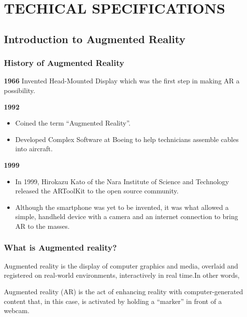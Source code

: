 \documentclass{article}
\begin{document}

\newpage
\section{TECHICAL SPECIFICATIONS}

\subsection{Introduction to Augmented Reality }

\subsubsection{History of Augmented Reality}
\par \textbf{1966} Invented Head-Mounted Display which was the first step in making AR a possibility.
\par \textbf{1992}
\begin{itemize}
\item Coined the term “Augmented Reality”.
\item Developed Complex Software at Boeing  to help technicians assemble cables into aircraft.
\end{itemize}

\par \textbf{1999}
\begin{itemize}
\item In 1999, Hirokazu Kato of the Nara Institute of Science and Technology released the ARToolKit to the open source community.
\item Although the smartphone was yet to be invented, it was what allowed a simple, handheld device with a camera and an internet connection to bring AR to the masses.
\end{itemize}


\subsubsection{What is Augmented reality? }
\par Augmented reality is the display of computer graphics and media, overlaid and registered on real-world environments, interactively in real time.{\small{In other words,}}
\par Augmented reality (AR) is the act of enhancing reality with computer-generated content that, in this case, is activated by holding a “marker” in front of a webcam.
\end{document}
